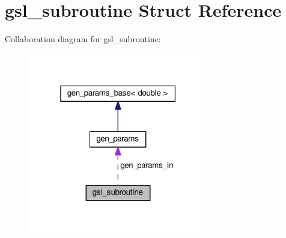 \hypertarget{structgsl__subroutine}{}\section{gsl\+\_\+subroutine Struct Reference}
\label{structgsl__subroutine}


Collaboration diagram for gsl\+\_\+subroutine\+:\nopagebreak
\begin{figure}[H]
\begin{center}
\leavevmode
\includegraphics[width=223pt]{structgsl__subroutine__coll__graph}
\end{center}
\end{figure}
